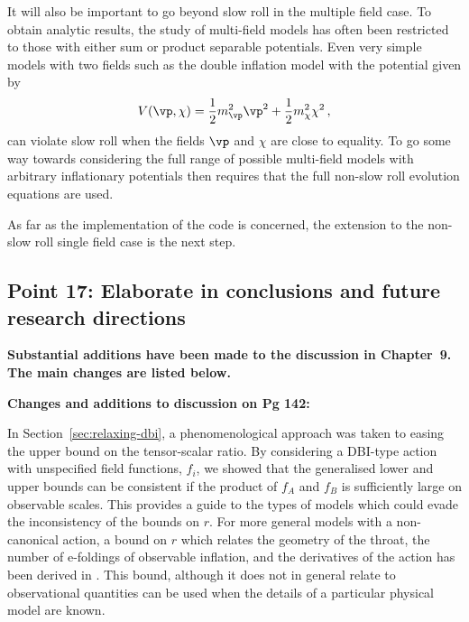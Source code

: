 It will also be important to go beyond slow roll in the multiple field case.
To obtain analytic results, the study of multi-field models has often been restricted to those with
either sum or product separable potentials. Even very simple
models with two fields such as the double inflation model with the potential given by
\cite{Turner:1986te, Silk:1986vc}
% 
\begin{equation}
 V(\vp,\chi) = \frac{1}{2}m_\vp^2\vp^2 + \frac{1}{2}m_\chi^2 \chi^2\,,
\end{equation}
% 
can violate slow roll when the fields $\vp$ and $\chi$ are close to
equality. To go some way towards considering the full range of possible multi-field models with
arbitrary inflationary potentials then requires that the full non-slow roll evolution equations are
used.


As far as the implementation of the code is concerned, the extension to the non-slow roll single
field case is the next step.


\subsection{Point 17: Elaborate in conclusions and future research directions}

\textbf{Substantial additions have been made to the discussion in Chapter~9. The main changes are
listed below.}

\textbf{Changes and additions to discussion on Pg 142:}

In Section~\ref{sec:relaxing-dbi}, a phenomenological approach was taken to easing
the upper bound on the tensor-scalar ratio. By considering a DBI-type action with unspecified field
functions,
$f_i$, we showed that the generalised lower and upper bounds can be consistent
if the product of $f_A$ and $f_B$ is sufficiently large on observable scales. This provides a guide
to the types of models which could evade the inconsistency of the bounds on $r$. For more general
models with a non-canonical action, a bound on $r$ which relates the geometry of the throat, the
number of e-foldings of observable inflation, and the derivatives of the action has been derived in
. This bound, although it does not in general relate to observational quantities can
be used when the details of a particular physical model are known.

